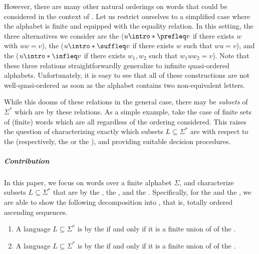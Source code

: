 \AP However, there are many other natural orderings on words that could be
considered in the context of . Let us restrict
ourselves to a simplified case where the alphabet is finite and equipped with
the equality relation. In this setting, the three alternatives we consider are
the  ($u \intro*\prefleq v$ if there exists $w$ with
$uw = v$), the  ($u \intro*\suffleq v$ if there
exists $w$ such that $wu = v$), and the  ($u
\intro*\infleq v$ if there exists $w_1,w_2$ such that $w_1 u w_2 = v$). Note
that these three relations straightforwardly generalize to infinite
quasi-ordered alphabets. Unfortunately, it is easy to see that all of these
constructions are not well-quasi-ordered as soon as the alphabet contains two
non-equivalent letters. 

\AP While this dooms  of these relations in the general case, there may be
\emph{subsets} of $\Sigma^*$ which are  by these
relations. As a simple example, take the case of finite sets of (finite) words
which are all  regardless of the ordering considered.
This raises the question of characterizing exactly which subsets $L \subseteq \Sigma^*$
are  with respect to the 
(respectively, the  or the ), and
providing suitable decision procedures.



\subparagraph{Contribution} In this paper, we focus on words over a finite
alphabet $\Sigma$, and characterize subsets $L \subseteq \Sigma^*$ that are
 by the , the ,
and the . Specifically, for the  and the , we are able to show the following decomposition into , that is, totally ordered ascending sequences.

{
\renewcommand{\labelenumi}{R\arabic{enumi}}
\begin{enumerate}
	\item A language $L \subseteq \Sigma^*$ is  by the  if and only if it is a finite union of  of the .
	\item A language $L \subseteq \Sigma^*$ is  by the  if and only if it is a finite union of  of the .
\end{enumerate}
}

